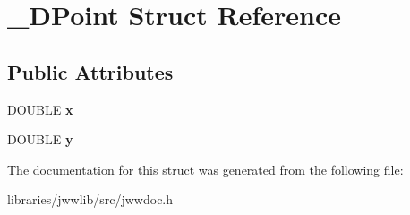 \hypertarget{struct__DPoint}{\section{\-\_\-\-D\-Point Struct Reference}
\label{struct__DPoint}
}
\subsection*{Public Attributes}
\begin{DoxyCompactItemize}
\item 
\hypertarget{struct__DPoint_a5cda39d70f18408de20021b65597442e}{D\-O\-U\-B\-L\-E {\bfseries x}}\label{struct__DPoint_a5cda39d70f18408de20021b65597442e}

\item 
\hypertarget{struct__DPoint_a4b5a9c43a8dfc615f3775b3e29161c7e}{D\-O\-U\-B\-L\-E {\bfseries y}}\label{struct__DPoint_a4b5a9c43a8dfc615f3775b3e29161c7e}

\end{DoxyCompactItemize}


The documentation for this struct was generated from the following file\-:\begin{DoxyCompactItemize}
\item 
libraries/jwwlib/src/jwwdoc.\-h\end{DoxyCompactItemize}
